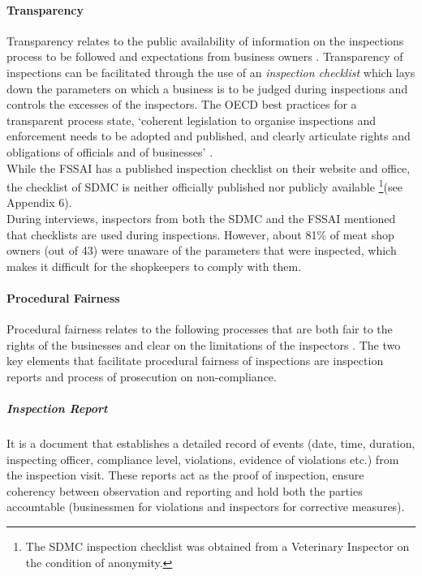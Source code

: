 \documentclass[a4paper, 12pt]{article}
\begin{document}
\paragraph{Transparency}

Transparency relates to the public availability of information on the inspections process to be followed and expectations from business owners \parencite{blancreport}. Transparency of inspections can be facilitated through the use of an \textit {inspection checklist} which lays down the parameters on which a business is to be judged during inspections and controls the excesses of the inspectors. The OECD best practices for a transparent process state, ‘coherent legislation to organise inspections and enforcement needs to be adopted and published, and clearly articulate rights and obligations of officials and of businesses’ \parencite{oecd1report}.\\

While the FSSAI has a published inspection checklist on their website and office, the checklist of SDMC is neither officially published nor publicly available \footnote{ The SDMC inspection checklist was obtained from a Veterinary Inspector on the condition of anonymity.}(see Appendix 6). \\

During interviews, inspectors from both the SDMC and the FSSAI mentioned that checklists are used during inspections. However, about 81\% of meat shop owners (out of 43) were unaware of the parameters that were inspected, which makes it difficult for the shopkeepers to comply with them. \\

\paragraph{Procedural Fairness}

Procedural fairness relates to the following processes that are both fair to the rights of the businesses and clear on the limitations of the inspectors \parencite{oecdreport}. The two key elements that facilitate procedural fairness of inspections are inspection reports and process of prosecution on non-compliance.\\

\subparagraph{Inspection Report}

It is a document that establishes a detailed record of events (date, time, duration, inspecting officer, compliance level, violations, evidence of violations etc.) from the inspection visit. These reports act as the proof of inspection, ensure coherency between observation and reporting and hold both the parties accountable (businessmen for violations and inspectors for corrective measures). \\
\end{document}
